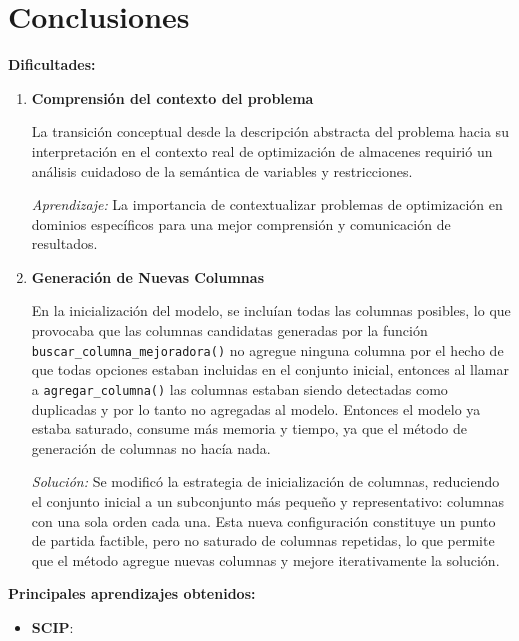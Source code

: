 \documentclass[a4paper,12pt]{article}
\begin{document}
\clearpage
\section{Conclusiones}

\textbf{Dificultades:}

\begin{enumerate}
    \item \textbf{Comprensión del contexto del problema}
    
    La transición conceptual desde la descripción abstracta del problema hacia su interpretación en el contexto real de optimización de almacenes requirió un análisis cuidadoso de la semántica de variables y restricciones.
    
    \emph{Aprendizaje:} La importancia de contextualizar problemas de optimización en dominios específicos para una mejor comprensión y comunicación de resultados.


    \item \textbf{Generación de Nuevas Columnas}
    
    En la inicialización del modelo, se incluían todas las columnas posibles, lo que provocaba que las columnas candidatas generadas por la función \texttt{buscar\_columna\_mejoradora()} no agregue ninguna columna por el hecho de que todas opciones estaban incluidas en el conjunto inicial, entonces al llamar a \texttt{agregar\_columna()} las columnas estaban siendo detectadas como duplicadas y por lo tanto no agregadas al modelo. Entonces el modelo ya estaba saturado, consume más memoria y tiempo, ya que el método de generación de columnas no hacía nada. 
    
    \emph{Solución:} Se modificó la estrategia de inicialización de columnas, reduciendo el conjunto inicial a un subconjunto más pequeño y representativo: columnas con una sola orden cada una. Esta nueva configuración constituye un punto de partida factible, pero no saturado de columnas repetidas, lo que permite que el método agregue nuevas columnas y mejore iterativamente la solución.

\end{enumerate}

\textbf{Principales aprendizajes obtenidos:}

\begin{itemize}
    \item \textbf{SCIP}: 
    
\end{itemize}
\end{document}
